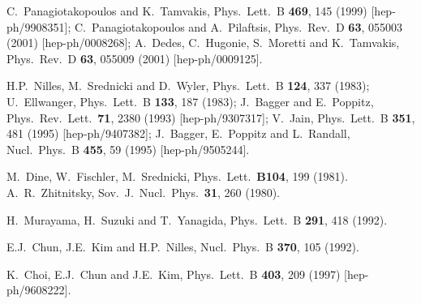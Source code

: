 \documentclass[12pt]{article}
\begin{document}
\begin{thebibliography}{999}
C.~Panagiotakopoulos and K.~Tamvakis,
  Phys.\ Lett.\ B {\bf 469}, 145 (1999)
  [hep-ph/9908351];
C.~Panagiotakopoulos and A.~Pilaftsis,
  Phys.\ Rev.\ D {\bf 63}, 055003 (2001)
  [hep-ph/0008268];
A.~Dedes, C.~Hugonie, S.~Moretti and K.~Tamvakis,
  Phys.\ Rev.\ D {\bf 63}, 055009 (2001)
  [hep-ph/0009125].

H.P.~Nilles, M.~Srednicki and D.~Wyler,
  Phys.\ Lett.\ B {\bf 124}, 337 (1983);
U.~Ellwanger,
  Phys.\ Lett.\ B {\bf 133}, 187 (1983);
J.~Bagger and E.~Poppitz,
  Phys.\ Rev.\ Lett.\  {\bf 71}, 2380 (1993)
  [hep-ph/9307317];
V.~Jain,
  Phys.\ Lett.\ B {\bf 351}, 481 (1995)
  [hep-ph/9407382];
J.~Bagger, E.~Poppitz and L.~Randall,
  Nucl.\ Phys.\ B {\bf 455}, 59 (1995)
  [hep-ph/9505244].

  M.~Dine, W.~Fischler, M.~Srednicki,
  Phys.\ Lett.\  {\bf B104}, 199 (1981).
  A.~R.~Zhitnitsky,
  Sov.\ J.\ Nucl.\ Phys.\  {\bf 31}, 260 (1980).

  H.~Murayama, H.~Suzuki and T.~Yanagida,
  Phys.\ Lett.\  B {\bf 291}, 418 (1992).

E.J.~Chun, J.E.~Kim and H.P.~Nilles, 
  Nucl.\ Phys.\ B {\bf 370}, 105 (1992).

  K.~Choi, E.J.~Chun and J.E.~Kim,
  Phys.\ Lett.\  B {\bf 403}, 209 (1997)
  [hep-ph/9608222].


\end{thebibliography}
\end{document}
